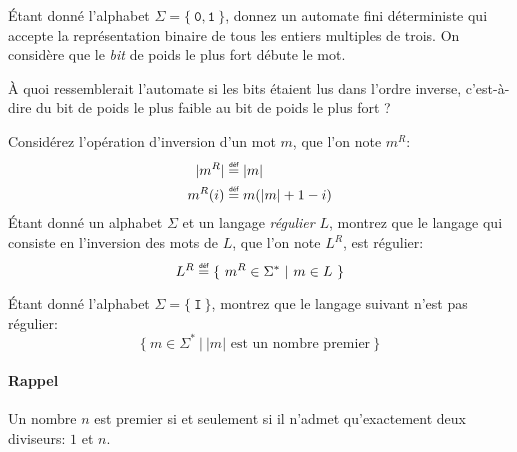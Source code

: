 \documentclass[12pt,french,a4paper]{article}
\newcommand\eqdef{\mathrel{\overset{\makebox[0pt]{\mbox{\normalfont\tiny\sffamily déf}}}{=}}}
\begin{document}
\vspace{1cm}

\begin{question}
Étant donné l'alphabet $\Sigma = \{\ \texttt{0}, \texttt{1}\ \}$, donnez un automate fini déterministe qui accepte la représentation binaire de tous les entiers multiples de trois. On considère que le \textit{bit} de poids le plus fort débute le mot.

À quoi ressemblerait l'automate si les bits étaient lus dans l'ordre inverse, c'est-à-dire du bit de poids le plus faible au bit de poids le plus fort ?
\end{question}

\vspace{1cm}

\begin{question}
Considérez l'opération d'inversion d'un mot $m$, que l'on note $m^R$:
\begin{align*}
|m^R| &\eqdef |m|\\
m^R(i) &\eqdef m(|m| + 1 - i)
\end{align*}
Étant donné un alphabet $\Sigma$ et un langage \textit{régulier} $L$, montrez que le langage qui consiste en l'inversion des mots de $L$, que l'on note $L^R$, est régulier:
\[
L^R \eqdef \{\ m^R \in \Sigma^*\ |\ m \in L\  \}
\]
\end{question}

\newpage

\begin{question}
Étant donné l'alphabet $\Sigma = \{\ \texttt{I}\ \}$, montrez que le langage suivant n'est pas régulier:
\[
\{\ m \in \Sigma^*\ |\ |m| \text{ est un nombre premier}\ \}
\]
\paragraph{Rappel}
Un nombre $n$ est premier si et seulement si il n'admet qu'exactement deux diviseurs: $1$ et $n$.
\end{question}

\vspace{3cm}
\end{document}
